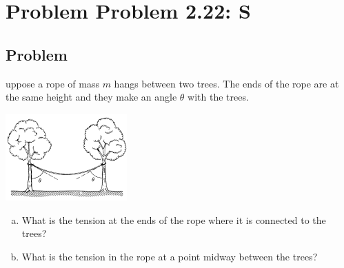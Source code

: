 \documentclass[solutions]{esg8012pset}
\begin{document}
\section*{Problem Problem 2.22: S}
\subsection*{Problem}
uppose a rope of mass $m$ hangs between two trees. The ends of the rope are at the same height and they make an angle $\theta$ with the trees.
  \begin{center}\includegraphics[width=0.35\textwidth]{ps02_5}\end{center}
  \begin{enumerate}[a)]
    \item What is the tension at the ends of the rope where it is connected to the trees?
    \item What is the tension in the rope at a point midway between the trees?
  \end{enumerate}
\end{document}
